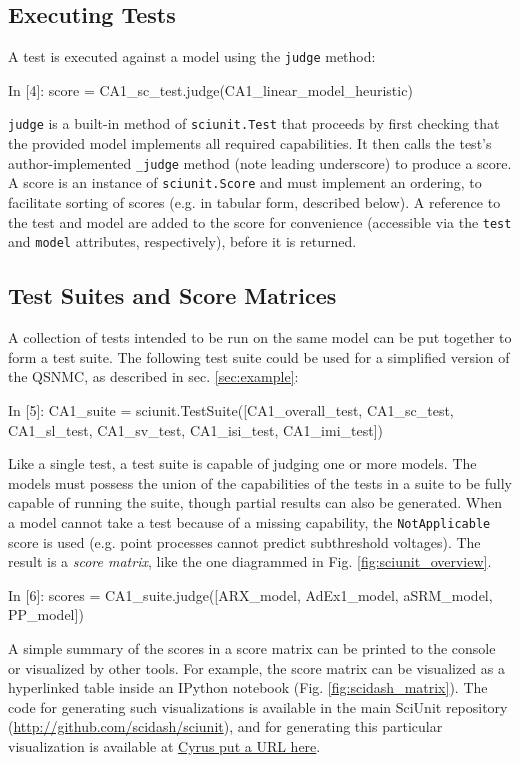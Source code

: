 \documentclass{frontiersSCNS}
\let\verbx\lstinline
\begin{document}
\subsection{Executing Tests} A test is executed against a model using the \verbx{judge} method:
\begin{ipy}
  In [4]: score = CA1_sc_test.judge(CA1_linear_model_heuristic)
\end{ipy}

\verbx{judge} is a built-in method of \verbx{sciunit.Test} that proceeds by first checking that the provided model implements all required capabilities. 
It then calls the test's author-implemented \verbx{_judge} method (note leading underscore) to produce a score. A score is an instance of \verbx{sciunit.Score} and must implement an ordering, to facilitate sorting of scores (e.g. in tabular form, described below). 
A reference to the test and model are added to the score for convenience (accessible via the \verbx{test} and \verbx{model} attributes, respectively), before it is returned.

\subsection{Test Suites and Score Matrices}\label{sec:visualization} A collection of tests intended to be run on the same model can be put together to form a test suite.
The following test suite could be used for a simplified version of the QSNMC, as described in sec. \ref{sec:example}:  
\begin{ipy}
  In [5]: CA1_suite = sciunit.TestSuite([CA1_overall_test, CA1_sc_test, CA1_sl_test, CA1_sv_test, 
              CA1_isi_test, CA1_imi_test])
\end{ipy}
Like a single test, a test suite is capable of judging one or more models. 
The models must possess the union of the capabilities of the tests in a suite to be fully capable of running the suite, though partial results can also be generated. 
When a model cannot take a test because of a missing capability, the \texttt{NotApplicable} score is used (e.g. point processes cannot predict subthreshold voltages). 
The result is a \emph{score matrix}, like the one diagrammed in Fig. \ref{fig:sciunit_overview}.
\begin{ipy}
  In [6]: scores = CA1_suite.judge([ARX_model, AdEx1_model, aSRM_model, PP_model])
\end{ipy}
A simple summary of the scores in a score matrix can be printed to the console or visualized by other tools.  
For example, the score matrix can be visualized as a hyperlinked table inside an IPython notebook \citep{perez_ipython_2007} (Fig. \ref{fig:scidash_matrix}).  The code for generating such visualizations is available in the main SciUnit repository (\url{http://github.com/scidash/sciunit}), and for generating this particular visualization is available at \url{Cyrus put a URL here}.  
\end{document}
